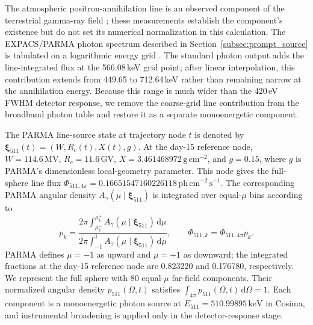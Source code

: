 \documentclass[11pt]{article}
\begin{document}
The atmospheric positron-annihilation line is an observed component of the
terrestrial gamma-ray field
\cite{Mahoney1981Atmospheric,Harris2003Atmospheric}; these measurements
establish the component's existence but do not set its numerical normalization
in this calculation. The EXPACS/PARMA photon
spectrum described in Section~\ref{subsec:prompt_source} is tabulated on a
logarithmic energy grid \cite{Sato2015EXPACS,Sato2016PARMA4}. The standard
photon output adds the line-integrated flux at the 566.08\,keV grid point; after
linear interpolation, this contribution extends from 449.65 to 712.64\,keV
rather than remaining narrow at the annihilation energy. Because this range is
much wider than the 420\,eV FWHM detector response, we remove the coarse-grid
line contribution from the broadband photon table and restore it as a separate
monoenergetic component.

The PARMA line-source state at trajectory node $t$ is denoted by
$\boldsymbol{\xi}_{511}(t)=(W,R_c(t),X(t),g)$. At the day-15 reference node,
$W=114.6\,\mathrm{MV}$, $R_c=11.6\,\mathrm{GV}$,
$X=3.461468972\,\mathrm{g\,cm^{-2}}$, and $g=0.15$, where $g$ is PARMA's
dimensionless local-geometry parameter. This node gives the full-sphere line flux
$\Phi_{511,4\pi}=0.16651547160226118\,\mathrm{ph\,cm^{-2}\,s^{-1}}$. The
corresponding PARMA angular density
$A_\gamma(\mu\mid\boldsymbol{\xi}_{511})$ is integrated over equal-$\mu$ bins
according to
\begin{equation}
  p_k=
  \frac{2\pi\int_{\mu_k^-}^{\mu_k^+}
        A_\gamma(\mu\mid\boldsymbol{\xi}_{511})\,\mathrm{d}\mu}
       {2\pi\int_{-1}^{1}
        A_\gamma(\mu\mid\boldsymbol{\xi}_{511})\,\mathrm{d}\mu},
  \qquad
  \Phi_{511,k}=\Phi_{511,4\pi}p_k .
  \label{eq:atm511_bins}
\end{equation}
PARMA defines $\mu=-1$ as upward and $\mu=+1$ as downward; the integrated
fractions at the day-15 reference node are 0.823220 and 0.176780, respectively.
We represent the full sphere with 80 equal-$\mu$ far-field components. Their
normalized angular density $p_{511}(\Omega,t)$ satisfies
$\int_{4\pi}p_{511}(\Omega,t)\,\mathrm{d}\Omega=1$. Each component is a
monoenergetic photon source at $E_{511}=510.99895\,\mathrm{keV}$ in Cosima, and
instrumental broadening is applied only in the detector-response stage.
\end{document}
